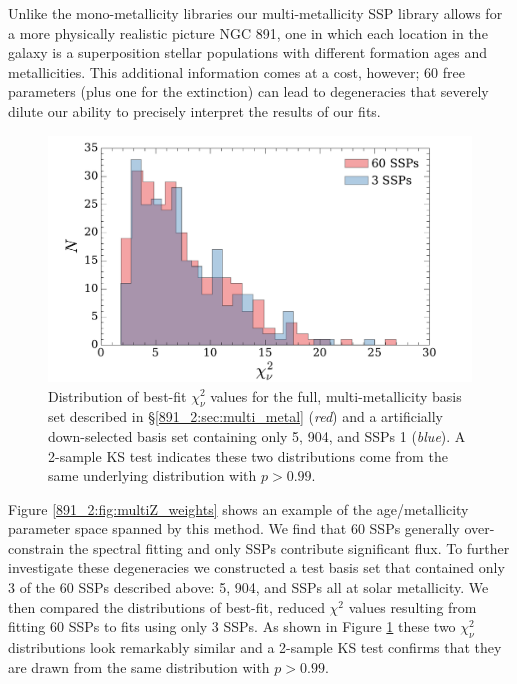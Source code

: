 Unlike the mono-metallicity libraries our multi-metallicity SSP
library allows for a more physically realistic picture NGC 891, one in
which each location in the galaxy is a superposition stellar
populations with different formation ages and metallicities. This
additional information comes at a cost, however; 60 free parameters
(plus one for the extinction) can lead to degeneracies that severely
dilute our ability to precisely interpret the results of our fits.

\begin{figure}
  \centering
  \includegraphics[width=\columnwidth]{891_2/figs/allz_chihist.pdf}
  \caption[$\chi_{\nu}^2$ distributions for template libraries with 60
    and 3 SSPs]{\fixspacing\label{891_2:fig:3SSP_chi}Distribution of
    best-fit $\chi^2_\nu$ values for the full, multi-metallicity basis
    set described in \S\ref{891_2:sec:multi_metal} (\emph{red}) and a
    artificially down-selected basis set containing only 5, 904, and
     SSPs 1 \Zsol (\emph{blue}). A 2-sample KS test
    indicates these two distributions come from the same underlying
    distribution with $p > 0.99$.}
\end{figure}

Figure \ref{891_2:fig:multiZ_weights} shows an example of the
age/metallicity parameter space spanned by this method. We find that
60 SSPs generally over-constrain the spectral fitting and only 
SSPs contribute significant flux. To further investigate these
degeneracies we constructed a test basis set that contained only 3 of
the 60 SSPs described above: 5, 904, and  SSPs all at
solar metallicity. We then compared the distributions of best-fit,
reduced $\chi^2$ values resulting from fitting 60 SSPs to fits using
only 3 SSPs. As shown in Figure \ref{891_2:fig:3SSP_chi} these two
$\chi^2_\nu$ distributions look remarkably similar and a 2-sample KS
test confirms that they are drawn from the same distribution with $p >
0.99$. 

